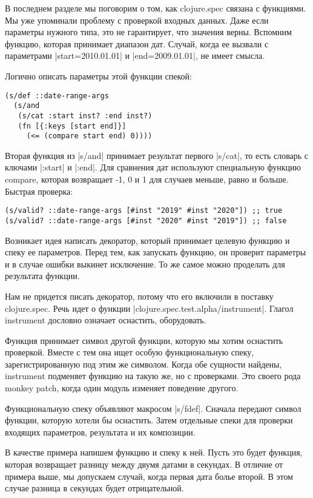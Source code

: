В последнем разделе мы поговорим о том, как clojure.spec связана с функциями. Мы
уже упоминали проблему с проверкой входных данных. Даже если параметры нужного
типа, это не гарантирует, что значения верны. Вспомним функцию, которая
принимает диапазон дат. Случай, когда ее вызвали с параметрами
\spverb|start=2010.01.01| и \spverb|end=2009.01.01|, не имеет смысла.

Логично описать параметры этой функции спекой:

\begin{verbatim}
(s/def ::date-range-args
  (s/and
   (s/cat :start inst? :end inst?)
   (fn [{:keys [start end]}]
     (<= (compare start end) 0))))
\end{verbatim}

Вторая функция из \spverb|s/and| принимает результат первого \spverb|s/cat|, то есть словарь с
ключами \spverb|:start| и \spverb|:end|. Для сравнения дат используют специальную функцию
compare, которая возвращает -1, 0 и 1 для случаев меньше, равно и
больше. Быстрая проверка:

\begin{verbatim}
(s/valid? ::date-range-args [#inst "2019" #inst "2020"]) ;; true
(s/valid? ::date-range-args [#inst "2020" #inst "2019"]) ;; false
\end{verbatim}

Возникает идея написать декоратор, который принимает целевую функцию и спеку ее
параметров. Перед тем, как запускать функцию, он проверит параметры и в случае
ошибки выкинет исключение. То же самое можно проделать для результата функции.

Нам не придется писать декоратор, потому что его включили в поставку
clojure.spec. Речь идет о функции \spverb|clojure.spec.test.alpha/instrument|. Глагол
instrument дословно означает оснастить, оборудовать.

Функция принимает символ другой функции, которую мы хотим оснастить
проверкой. Вместе с тем она ищет особую функциональную спеку, зарегистрированную
под этим же символом. Когда обе сущности найдены, instrument подменяет функцию
на такую же, но с проверками. Это своего рода monkey patch, когда один модуль
изменяет поведение другого.

Функциональную спеку объявляют макросом \spverb|s/fdef|. Сначала передают символ
функции, которую хотели бы оснастить. Затем отдельные спеки для проверки
входящих параметров, результата и их композиции.

В качестве примера напишем функцию и спеку к ней. Пусть это будет функция,
которая возвращает разницу между двумя датами в секундах. В отличие от примера
выше, мы допускаем случай, когда первая дата болье второй. В этом случае разница
в секундах будет отрицательной.


